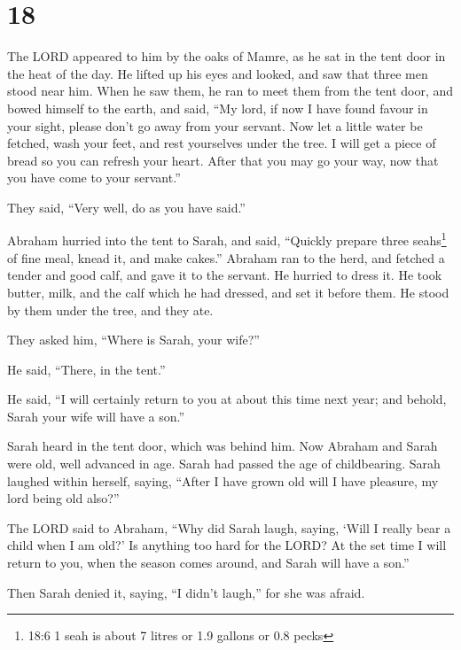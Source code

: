 \hypertarget{section-17}{%
\section{18}\label{section-17}}

 The LORD appeared to him by the oaks of Mamre, as he sat in
the tent door in the heat of the day.  He lifted up his eyes
and looked, and saw that three men stood near him. When he saw them, he
ran to meet them from the tent door, and bowed himself to the earth,
 and said, ``My lord, if now I have found favour in your
sight, please don't go away from your servant.  Now let a
little water be fetched, wash your feet, and rest yourselves under the
tree.  I will get a piece of bread so you can refresh your
heart. After that you may go your way, now that you have come to your
servant.''

They said, ``Very well, do as you have said.''

 Abraham hurried into the tent to Sarah, and said, ``Quickly
prepare three seahs\footnote{18:6 1 seah is about 7 litres or 1.9
  gallons or 0.8 pecks} of fine meal, knead it, and make cakes.''
 Abraham ran to the herd, and fetched a tender and good
calf, and gave it to the servant. He hurried to dress it. 
He took butter, milk, and the calf which he had dressed, and set it
before them. He stood by them under the tree, and they ate.

 They asked him, ``Where is Sarah, your wife?''

He said, ``There, in the tent.''

 He said, ``I will certainly return to you at about this
time next year; and behold, Sarah your wife will have a son.''

Sarah heard in the tent door, which was behind him.  Now
Abraham and Sarah were old, well advanced in age. Sarah had passed the
age of childbearing.  Sarah laughed within herself, saying,
``After I have grown old will I have pleasure, my lord being old also?''

 The LORD said to Abraham, ``Why did Sarah laugh, saying,
`Will I really bear a child when I am old?'  Is anything
too hard for the LORD? At the set time I will return to you, when the
season comes around, and Sarah will have a son.''

 Then Sarah denied it, saying, ``I didn't laugh,'' for she
was afraid.

